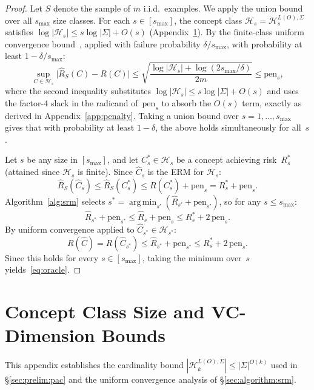 \documentclass[accepted]{uai2026} %
\theoremstyle{definition}
\theoremstyle{remark}
\DeclareMathOperator*{\argmin}{arg\,min}
\begin{document}
\begin{proof}
Let $S$ denote the sample of $m$ i.i.d.\
examples.
We apply the union bound over all $s_{\max}$ size classes.
For each $s \in [s_{\max}]$, the concept class
$\mathcal{H}_s = \mathcal{H}_{s}^{L(O),\Sigma}$ satisfies
$\log|\mathcal{H}_s| \leq s \log |\Sigma| + O(s)$
(Appendix~\ref{app:vc}). By the finite-class uniform convergence
bound~\citep{DBLP:books/daglib/0033642}, applied with failure
probability $\delta / s_{\max}$, with probability at least
$1 - \delta/s_{\max}$:
\[
  \sup_{C \in \mathcal{H}_s}
    \bigl| \hat{R}_S(C) - R(C) \bigr|
  \leq
  \sqrt{\frac{\log|\mathcal{H}_s| + \log(2 s_{\max}/\delta)}{2m}}
  \leq
  \mathrm{pen}_s,
\]
where the second inequality substitutes
$\log|\mathcal{H}_s| \leq s\log|\Sigma| + O(s)$ and uses the
factor-$4$ slack in the radicand of~$\mathrm{pen}_s$ to absorb
the $O(s)$ term, exactly as derived in
Appendix~\ref{app:penalty}.
Taking a union bound over $s = 1, \ldots, s_{\max}$ gives that
with probability at least $1 - \delta$, the above holds
simultaneously for all~$s$.

Let $s$ be any size in $[s_{\max}]$, and let
$C_s^* \in \mathcal{H}_s$ be a concept achieving risk~$R_s^*$
(attained since $\mathcal{H}_s$ is
finite). Since $\hat{C}_s$ is
the ERM for $\mathcal{H}_s$:
\[
  \hat{R}_S(\hat{C}_s)
  \leq \hat{R}_S(C_s^*)
  \leq R(C_s^*) + \mathrm{pen}_s
  = R_s^* + \mathrm{pen}_s.
\]
Algorithm~\ref{alg:srm} selects $s^* = \argmin_{s'}
(\hat{R}_{s'} + \mathrm{pen}_{s'})$, so for any
$s \leq s_{\max}$:
\[
  \hat{R}_{s^*} + \mathrm{pen}_{s^*}
  \leq \hat{R}_s + \mathrm{pen}_s
  \leq R_s^* + 2\,\mathrm{pen}_s.
\]
By uniform convergence applied to
$\hat{C}_{s^*} \in \mathcal{H}_{s^*}$:
\[
  R(\hat{C})
  = R(\hat{C}_{s^*})
  \leq \hat{R}_{s^*} + \mathrm{pen}_{s^*}
  \leq R_s^* + 2\,\mathrm{pen}_s.
\]
Since this holds for every $s \in [s_{\max}]$, taking the
minimum over~$s$ yields~\eqref{eq:oracle}.
\end{proof}

\section{Concept Class Size and VC-Dimension Bounds}\label{app:vc}

This appendix establishes the cardinality bound
$|\mathcal{H}_k^{L(O),\Sigma}| \leq |\Sigma|^{O(k)}$ used in
\S\ref{sec:prelim:pac} and the uniform convergence
analysis of \S\ref{sec:algorithm:srm}.
\end{document}
